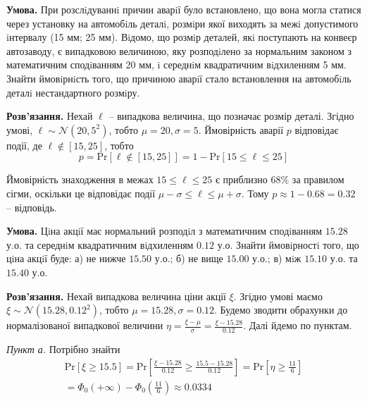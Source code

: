 \documentclass[oneside,solution]{karazin-prob-theory-assign}
\begin{document}

\hspace{20px}\textbf{Умова.} При розслiдуваннi причин аварiї було встановлено, що вона могла статися через установку на автомобiль деталi, розмiри якої виходять за межi допустимого iнтервалу (15 мм; 25
мм). Вiдомо, що розмiр деталей, якi поступають на конвеєр автозаводу, є випадковою величиною, яку розподiлено за нормальним законом з математичним сподiванням 20 мм, i середнiм квадратичним вiдхиленням 5 мм. Знайти ймовiрнiсть того, що причиною аварiї
стало встановлення на автомобiль деталi нестандартного розмiру.

\textbf{Розв'язання.} Нехай $\ell$ -- випадкова величина, що позначає розмір деталі. Згідно умові, $\ell \sim \mathcal{N}(20, 5^2)$, тобто $\mu=20, \sigma=5$. Ймовірність аварії $p$ відповідає події, де $\ell \notin [15, 25]$, тобто
\begin{equation}
    p = \text{Pr}[\ell \notin [15,25]] = 1 - \text{Pr}[15 \leq \ell \leq 25]
\end{equation}

Ймовірність знаходження в межах $15 \leq \ell \leq 25$ є приблизно $68\%$ за правилом сігми, оскільки це відповідає події $\mu-\sigma \leq \ell \leq \mu+\sigma$. Тому $p \approx 1-0.68 = 0.32$ -- відповідь.


\hspace{20px}\textbf{Умова.} Цiна акцiї має нормальний розподiл з математичним сподiванням $15.28$ у.о. та середнiм
квадратичним вiдхиленням $0.12$ у.о. Знайти ймовiрностi того, що цiна акцiї буде: а) не нижче $15.50$ у.о.; б) не вище $15.00$ у.о.; в) мiж $15.10$ у.о. та $15.40$ у.о.

\textbf{Розв'язання.} Нехай випадкова величина ціни акції $\xi$. Згідно умові маємо $\xi \sim \mathcal{N}(15.28, 0.12^2)$, тобто $\mu=15.28,\sigma=0.12$. Будемо зводити обрахунки до нормалізованої випадкової величини $\eta = \frac{\xi-\mu}{\sigma} = \frac{\xi - 15.28}{0.12}$. Далі йдемо по пунктам.

\textit{Пункт а.} Потрібно знайти
\begin{gather}
    \text{Pr}[\xi \geq 15.5] = \text{Pr}\left[\frac{\xi-15.28}{0.12} \geq \frac{15.5-15.28}{0.12}\right] = \text{Pr}\left[\eta \geq \frac{11}{6}\right] \nonumber \\
    = \Phi_0(+\infty) - \Phi_0\left(\frac{11}{6}\right) \approx 0.0334
\end{gather}
\end{document}
